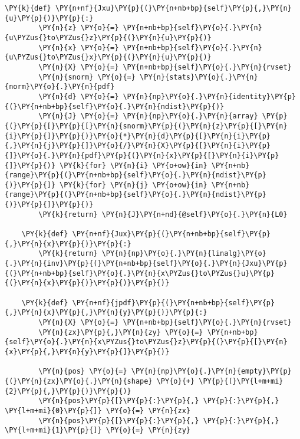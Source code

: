 \begin{tcolorbox}[breakable, size=fbox, boxrule=1pt, pad at break*=1mm,colback=cellbackground, colframe=cellborder]
\begin{Verbatim}[commandchars=\\\{\}]
    \PY{k}{def} \PY{n+nf}{Jxu}\PY{p}{(}\PY{n+nb+bp}{self}\PY{p}{,}\PY{n}{u}\PY{p}{)}\PY{p}{:}
        \PY{n}{z} \PY{o}{=} \PY{n+nb+bp}{self}\PY{o}{.}\PY{n}{u\PYZus{}to\PYZus{}z}\PY{p}{(}\PY{n}{u}\PY{p}{)}
        \PY{n}{x} \PY{o}{=} \PY{n+nb+bp}{self}\PY{o}{.}\PY{n}{u\PYZus{}to\PYZus{}x}\PY{p}{(}\PY{n}{u}\PY{p}{)}
        \PY{n}{X} \PY{o}{=} \PY{n+nb+bp}{self}\PY{o}{.}\PY{n}{rvset}
        \PY{n}{snorm} \PY{o}{=} \PY{n}{stats}\PY{o}{.}\PY{n}{norm}\PY{o}{.}\PY{n}{pdf}
        \PY{n}{d} \PY{o}{=} \PY{n}{np}\PY{o}{.}\PY{n}{identity}\PY{p}{(}\PY{n+nb+bp}{self}\PY{o}{.}\PY{n}{ndist}\PY{p}{)}
        \PY{n}{J} \PY{o}{=} \PY{n}{np}\PY{o}{.}\PY{n}{array} \PY{p}{(}\PY{p}{[}\PY{p}{[}\PY{n}{snorm}\PY{p}{(}\PY{n}{z}\PY{p}{[}\PY{n}{i}\PY{p}{]}\PY{p}{)}\PY{o}{*}\PY{n}{d}\PY{p}{[}\PY{n}{i}\PY{p}{,}\PY{n}{j}\PY{p}{]}\PY{o}{/}\PY{n}{X}\PY{p}{[}\PY{n}{i}\PY{p}{]}\PY{o}{.}\PY{n}{pdf}\PY{p}{(}\PY{n}{x}\PY{p}{[}\PY{n}{i}\PY{p}{]}\PY{p}{)} \PY{k}{for} \PY{n}{i} \PY{o+ow}{in} \PY{n+nb}{range}\PY{p}{(}\PY{n+nb+bp}{self}\PY{o}{.}\PY{n}{ndist}\PY{p}{)}\PY{p}{]} \PY{k}{for} \PY{n}{j} \PY{o+ow}{in} \PY{n+nb}{range}\PY{p}{(}\PY{n+nb+bp}{self}\PY{o}{.}\PY{n}{ndist}\PY{p}{)}\PY{p}{]}\PY{p}{)}
        \PY{k}{return} \PY{n}{J}\PY{n+nd}{@self}\PY{o}{.}\PY{n}{L0}
    
    \PY{k}{def} \PY{n+nf}{Jux}\PY{p}{(}\PY{n+nb+bp}{self}\PY{p}{,}\PY{n}{x}\PY{p}{)}\PY{p}{:}
        \PY{k}{return} \PY{n}{np}\PY{o}{.}\PY{n}{linalg}\PY{o}{.}\PY{n}{inv}\PY{p}{(}\PY{n+nb+bp}{self}\PY{o}{.}\PY{n}{Jxu}\PY{p}{(}\PY{n+nb+bp}{self}\PY{o}{.}\PY{n}{x\PYZus{}to\PYZus{}u}\PY{p}{(}\PY{n}{x}\PY{p}{)}\PY{p}{)}\PY{p}{)}

    \PY{k}{def} \PY{n+nf}{jpdf}\PY{p}{(}\PY{n+nb+bp}{self}\PY{p}{,}\PY{n}{x}\PY{p}{,}\PY{n}{y}\PY{p}{)}\PY{p}{:}
        \PY{n}{X} \PY{o}{=} \PY{n+nb+bp}{self}\PY{o}{.}\PY{n}{rvset}
        \PY{n}{zx}\PY{p}{,}\PY{n}{zy} \PY{o}{=} \PY{n+nb+bp}{self}\PY{o}{.}\PY{n}{x\PYZus{}to\PYZus{}z}\PY{p}{(}\PY{p}{[}\PY{n}{x}\PY{p}{,}\PY{n}{y}\PY{p}{]}\PY{p}{)}
        
        \PY{n}{pos} \PY{o}{=} \PY{n}{np}\PY{o}{.}\PY{n}{empty}\PY{p}{(}\PY{n}{zx}\PY{o}{.}\PY{n}{shape} \PY{o}{+} \PY{p}{(}\PY{l+m+mi}{2}\PY{p}{,}\PY{p}{)}\PY{p}{)}
        \PY{n}{pos}\PY{p}{[}\PY{p}{:}\PY{p}{,} \PY{p}{:}\PY{p}{,} \PY{l+m+mi}{0}\PY{p}{]} \PY{o}{=} \PY{n}{zx}
        \PY{n}{pos}\PY{p}{[}\PY{p}{:}\PY{p}{,} \PY{p}{:}\PY{p}{,} \PY{l+m+mi}{1}\PY{p}{]} \PY{o}{=} \PY{n}{zy}
        

\end{Verbatim}
\end{tcolorbox}
